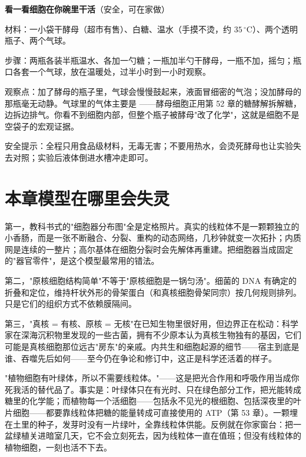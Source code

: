 \begin{shiyan}
\textbf{看一看细胞在你碗里干活}（安全，可在家做）

材料：一小袋干酵母（超市有售）、白糖、温水（手摸不烫，约 $35\,^{\circ}\mathrm{C}$）、两个透明瓶子、两个气球。

步骤：两瓶各装半瓶温水、各加一勺糖；一瓶加半勺干酵母，一瓶不加，摇匀；瓶口各套一个气球，放在温暖处，过半小时到一小时观察。

观察点：加了酵母的瓶子里，气球会慢慢鼓起来，液面冒细密的气泡；没加酵母的那瓶毫无动静。气球里的气体主要是 ——酵母细胞正用第 52 章的糖酵解拆解糖，边拆边排气。你看不到细胞内部，但整个瓶子被酵母"改了化学"，这就是细胞不是空袋子的宏观证据。

安全提示：全程只用食品级材料，无毒无害；不要用热水，会烫死酵母也让实验失去对照；实验后液体倒进水槽冲走即可。
\end{shiyan}

\section{本章模型在哪里会失灵}

第一，教科书式的"细胞器分布图"全是定格照片。真实的线粒体不是一颗颗独立的小香肠，而是一张不断融合、分裂、重构的动态网络，几秒钟就变一次拓扑；内质网是连续的一整片；高尔基体在细胞分裂时会先解体再重建。把细胞器当成固定的"器官零件"，是这个模型最常用的错法。

第二，"原核细胞结构简单"不等于"原核细胞是一锅匀汤"。细菌的 DNA 有确定的折叠和定位，维持杆状外形的骨架蛋白（和真核细胞骨架同宗）按几何规则排列。只是它们的组织方式不依赖膜隔间。

第三，"真核 = 有核、原核 = 无核"在已知生物里很好用，但边界正在松动：科学家在深海沉积物里发现的一些古菌，拥有不少原本认为真核生物独有的基因，它们可能是真核细胞那位远古"房东"的亲戚。内共生和细胞起源的细节——宿主到底是谁、吞噬先后如何——至今仍在争论和修订中，这正是科学还活着的样子。

\begin{wuqu}
"植物细胞有叶绿体，所以不需要线粒体。"——这是把光合作用和呼吸作用当成你死我活的替代品了。事实是：叶绿体只在有光时、只在绿色部分工作，把光能转成糖里的化学能；而植物每一个活细胞——包括永不见光的根细胞、包括深夜里的叶片细胞——都要靠线粒体把糖的能量转成可直接使用的 ATP（第 53 章）。一颗埋在土里的种子，发芽时没有一片绿叶，全靠线粒体供能。反例就在你家窗台：把一盆绿植关进暗室几天，它不会立刻死去，因为线粒体一直在值班；但没有线粒体的植物细胞，一刻也活不下去。
\end{wuqu}

